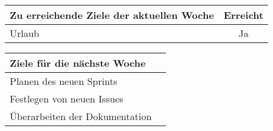 \begin{tabularx}{\textwidth}{Xc}
    \arrayrulecolor{OliveGreen}
    \toprule
    {\bfseries Zu erreichende Ziele der aktuellen Woche} & {\bfseries Erreicht} \\
    \midrule[2pt]
    Urlaub &Ja              \\
    \bottomrule[2pt]
\end{tabularx}
%
\vspace{1cm}
%
\begin{tabularx}{\textwidth}{Xc}
    \arrayrulecolor{OliveGreen}
    \toprule
    {\bfseries Ziele für die nächste Woche}        &                         \\
    \midrule[2pt]
    Planen des neuen Sprints                       &                         \\
    \rowcolor{OliveGreen!15}
    Festlegen von neuen Issues                     &                         \\
    \rowcolor{White}
    Überarbeiten der Dokumentation                 &                         \\
\end{tabularx}

